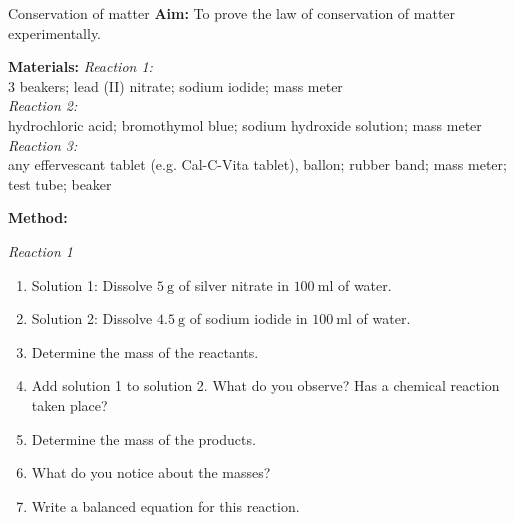             \begin{i_experiment}{Conservation of matter}
            \nopagebreak
            \label{m38711*eip-453}\noindent{}\textbf{Aim:}
To prove the law of conservation of matter experimentally.
\par 
\label{m38711*eip792}\noindent{}\textbf{Materials:}
\textsl{Reaction 1:} \\
3 beakers; lead (II) nitrate; sodium iodide; mass meter \\
\textsl{Reaction 2:} \\
 hydrochloric acid; bromothymol blue; sodium hydroxide solution; mass meter \\
 \textsl{Reaction 3:} \\
any effervescant tablet (e.g. Cal-C-Vita tablet), ballon; rubber band; mass meter; test tube; beaker
\par 
\label{m38711*eip-153}
	\par
      \label{m38711*id72432}\noindent
\textbf{Method:} \\
\begin{minipage}{.7\textwidth}
\textsl{Reaction 1} 
\label{m38711*id6342}\begin{enumerate}[noitemsep, label=\textbf{\arabic*}. ] 
            \item Solution 1: Dissolve $5~\text{g}$ of silver nitrate in $100~\text{ml}$ of water.
\item Solution 2: Dissolve $4.5~\text{g}$ of sodium iodide in $100~\text{ml}$ of water.
\item Determine the mass of the reactants.
\item Add solution 1 to solution 2. What do you observe? Has a chemical reaction taken place? 
\item Determine the mass of the products. 
\item What do you notice about the masses?
\item Write a balanced equation for this reaction.
\end{enumerate}
\end{minipage}
\begin{minipage}{.3\textwidth}
 \begin{center}
\end{center}
\end{minipage}
\end{i_experiment}
